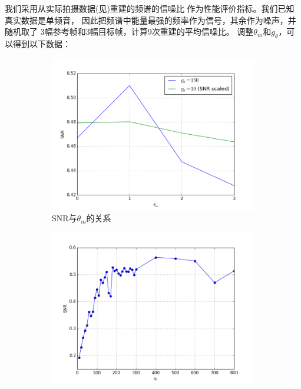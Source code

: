 我们采用从实际拍摄数据(见)重建的频谱的信噪比
作为性能评价指标。我们已知真实数据是单频音，
因此把频谱中能量最强的频率作为信号，其余作为噪声，并随机取了
3幅参考帧和3幅目标帧，计算9次重建的平均信噪比。
调整$\theta_m$和$g_\theta$，可以得到以下数据：
\begin{figure}[h!]\begin{center}
    \begin{subfigure}[b]{.33\figwidth}
        \includegraphics[width=.33\figwidth]{res/msa-lvl.png}
        \caption{SNR与$\theta_m$的关系}
        \label{fig:msa:lvl}
    \end{subfigure}
    \begin{subfigure}[b]{.33\figwidth}
        \includegraphics[width=.33\figwidth]{res/msa-vg.png}

\end{subfigure}
\end{center}
\end{figure}
